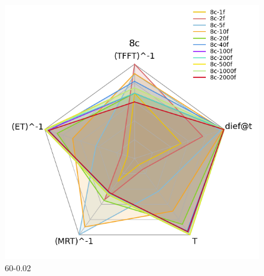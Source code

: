 \documentclass[12pt,a4paper]{article}
\begin{document}
\begin{figure}[H]
{\begin{minipage}{0.5\textwidth}
            \includegraphics[scale=0.6]{../processed/NRT/small/checks/60-0.02/fixedcores/8c/plots/radar-dieft.png}
            \caption*{60-0.02}
        \end{minipage}
    }
    
    \vspace{0.5cm} %



\end{figure}
\end{document}
